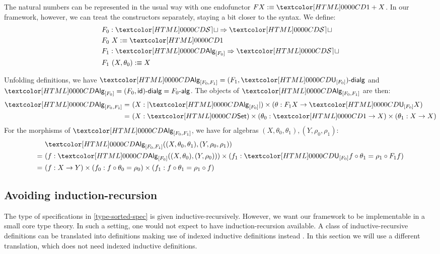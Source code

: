 \begin{example}
  The natural numbers can be represented in the usual way with one
  endofunctor $F X \ddefeq \unitty + X$. In our framework, however, we
  can treat the constructors separately, staying a bit closer to the
  syntax. We define:
  \begin{align*}
    &F_0 : \Func{\SET}{\SET} \\
    &F_0\ X \ddefeq \unitty \\
    &F_1 : \Func{\Alg_{[F_0]}}{\SET} \\
    &F_1\ (X,\theta_0) \ddefeq X
  \end{align*}

  Unfolding definitions, we have
  $\Alg_{[F_0,F_1]} = \dialgcat{F_1}{\Und_{[F_0]}}$ and
  $\Alg_{[F_0]} = \dialgcat{F_0}{\id} = \algcat{F_0}$. The objects of
  $\Alg_{[F_0,F_1]}$ are then:
  \begin{align*}
    \Alg_{[F_0,F_1]} =&\ (X : | \Alg_{[F_0]} |) \times (\theta : F_1 X \to \Und_{[F_0]} X)  \\
    =&\ (X : \Set) \times (\theta_0 : \unitty \to X) \times (\theta_1 : X \to X)
  \end{align*}
  For the morphisms of $\Alg_{[F_0,F_1]}$, we have for algebras
  $(X,\theta_0,\theta_1), (Y,\rho_0,\rho_1)$:
  \begin{align*}
    &\ \Alg_{[F_0,F_1]}((X,\theta_0,\theta_1),(Y,\rho_0,\rho_1))  \\
    =&\ (f : \Alg_{[F_0]}((X,\theta_0),(Y,\rho_0))) \times (f_1 : \Und_{[F_0]} f \circ \theta_1 = \rho_1 \circ F_1 f) \\
    =&\ (f : X \to Y) \times (f_0 : f \circ \theta_0 = \rho_0) \times (f_1 : f \circ \theta_1 = \rho_1 \circ f)
  \end{align*}
\end{example}

\subsection{Avoiding induction-recursion}
\label{avoiding-induction-recursion}

The type of specifications in \cref{type-sorted-spec} is given
inductive-recursively. However, we want our framework to be
implementable in a small core type theory. In such a setting, one
would not expect to have induction-recursion available. A class of
inductive-recursive definitions can be translated into definitions
making use of indexed inductive definitions instead
\cite{Malatesta2012}. In this section we will use a different
translation, which does not need indexed inductive definitions.

